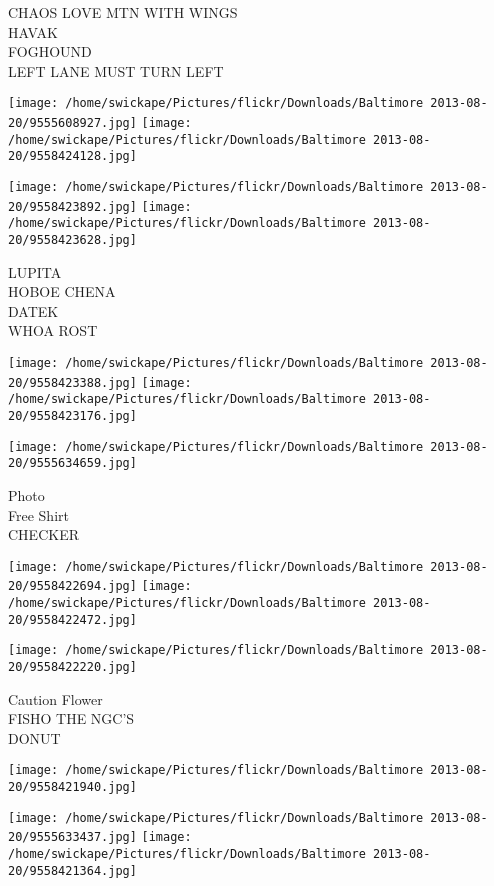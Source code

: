 \documentclass[10pt,letterpaper]{article}
\begin{document}
CHAOS LOVE MTN WITH WINGS\\
HAVAK\\
FOGHOUND\\
LEFT LANE MUST TURN LEFT\\
\pagebreak

\texttt{[image: /home/swickape/Pictures/flickr/Downloads/Baltimore 2013-08-20/9555608927.jpg]}
\texttt{[image: /home/swickape/Pictures/flickr/Downloads/Baltimore 2013-08-20/9558424128.jpg]}

\texttt{[image: /home/swickape/Pictures/flickr/Downloads/Baltimore 2013-08-20/9558423892.jpg]}
\texttt{[image: /home/swickape/Pictures/flickr/Downloads/Baltimore 2013-08-20/9558423628.jpg]}

LUPITA\\
HOBOE CHENA\\
DATEK\\
WHOA ROST\\
\pagebreak

\texttt{[image: /home/swickape/Pictures/flickr/Downloads/Baltimore 2013-08-20/9558423388.jpg]}
\texttt{[image: /home/swickape/Pictures/flickr/Downloads/Baltimore 2013-08-20/9558423176.jpg]}

\vspace{0.25in}
\texttt{[image: /home/swickape/Pictures/flickr/Downloads/Baltimore 2013-08-20/9555634659.jpg]}

Photo\\
Free Shirt\\
CHECKER\\
\pagebreak

\texttt{[image: /home/swickape/Pictures/flickr/Downloads/Baltimore 2013-08-20/9558422694.jpg]}
\texttt{[image: /home/swickape/Pictures/flickr/Downloads/Baltimore 2013-08-20/9558422472.jpg]}

\texttt{[image: /home/swickape/Pictures/flickr/Downloads/Baltimore 2013-08-20/9558422220.jpg]}

Caution Flower\\
FISHO THE NGC'S\\
DONUT\\
\pagebreak

\texttt{[image: /home/swickape/Pictures/flickr/Downloads/Baltimore 2013-08-20/9558421940.jpg]}

\vspace{0.25in}
\texttt{[image: /home/swickape/Pictures/flickr/Downloads/Baltimore 2013-08-20/9555633437.jpg]}
\texttt{[image: /home/swickape/Pictures/flickr/Downloads/Baltimore 2013-08-20/9558421364.jpg]}
\end{document}
